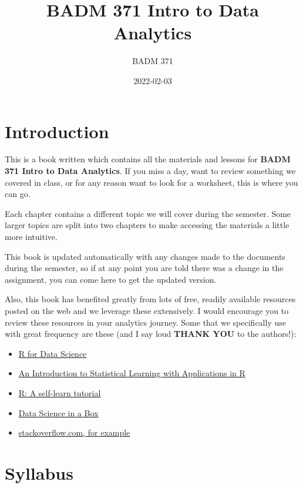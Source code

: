 \documentclass[
]{book}
\title{BADM 371 Intro to Data Analytics}
\author{BADM 371}
\date{2022-02-03}
\providecommand{\tightlist}{%
  \setlength{\itemsep}{0pt}\setlength{\parskip}{0pt}}
\begin{document}
\maketitle

{
\setcounter{tocdepth}{1}
\tableofcontents
}
\hypertarget{introduction}{%
\chapter{Introduction}\label{introduction}}

This is a book written which contains all the materials and lessons for \textbf{BADM 371 Intro to Data Analytics}. If you miss a day, want to review something we covered in class, or for any reason want to look for a worksheet, this is where you can go.

Each chapter contains a different topic we will cover during the semester. Some larger topics are split into two chapters to make accessing the materials a little more intuitive.

This book is updated automatically with any changes made to the documents during the semester, so if at any point you are told there was a change in the assignment, you can come here to get the updated version.

Also, this book has benefited greatly from lots of free, readily available resources posted on the web and we leverage these extensively. I would encourage you to review these resources in your analytics journey. Some that we specifically use with great frequency are these (and I say loud \textbf{THANK YOU} to the authors!):

\begin{itemize}
\tightlist
\item
  \href{https://r4ds.had.co.nz/}{R for Data Science}
\item
  \href{https://trevorhastie.github.io/ISLR/}{An Introduction to Statistical Learning with Applications in R}
\item
  \href{https://gsp.humboldt.edu/olm/R/Tutorials/BestFirstRTutorial.pdf}{R: A self-learn tutorial}
\item
  \href{https://datasciencebox.org/}{Data Science in a Box}
\item
  \href{https://stackoverflow.com/questions/4862178/remove-rows-with-all-or-some-nas-missing-values-in-data-frame?rq=1}{stackoverflow.com, for example}
\end{itemize}

\hypertarget{syllabus}{%
\chapter{Syllabus}\label{syllabus}}
\end{document}
